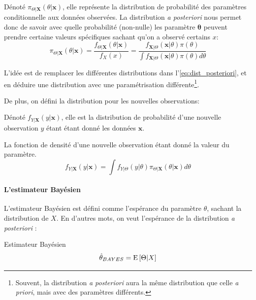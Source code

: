 \documentclass[10pt, french]{article}
\begin{document}
\begin{multicols*}{3}
\begin{definitionNOHFILL}
Dénoté $\pi_{\Theta | \bm{X}}(\theta | \bm{x})$, elle représente la distribution de probabilité des paramètres conditionnelle aux données observées. 
La distribution \emph{a posteriori} nous permet donc de savoir avec quelle probabilité (non-nulle) les paramètre $\bm\theta$ peuvent prendre certaine valeurs spécifiques sachant qu'on a observé certains $x$: 
\begin{equation}
\label{eq:dist_posteriori}
	\pi_{\Theta | \bm{X}}(\theta | \bm{x})
	= 	\frac{f_{\Theta | \bm{X}}(\theta | \bm{x})}{f_{X}(x)} 
	= 	\frac{f_{\bm{X}|\Theta}(\bm{x} | \theta) \pi(\theta)}{\int f_{\bm{X}|\Theta}(\bm{x} | \theta) \pi(\theta) d\theta} 
\end{equation}

L'idée est de remplacer les différentes distributions dans l'\autoref{eq:dist_posteriori}, et en déduire une distribution avec une paramétrisation différente\footnote{Souvent, la distribution \emph{a posteriori} aura la même distribution que celle \emph{a priori}, mais avec des paramètres différents.}.
\end{definitionNOHFILL}

De plus, on défini la distribution pour les nouvelles observations:
\begin{definitionNOHFILL}
Dénoté $f_{Y | \bm{X}}(y | \bm{x})$, elle est la distribution de probabilité d'une nouvelle observation $y$ étant étant donné les données $\bm{x}$.

La fonction de densité d'une nouvelle observation étant donné la valeur du paramètre.
\begin{equation*}
	f_{Y | \bm{X}}(y | \bm{x})
	=	\int f_{Y|\Theta}(y | \theta) \pi_{\Theta | \bm{X}}(\theta | \bm{x}) d\theta
\end{equation*}

\end{definitionNOHFILL}


\paragraph{L'estimateur Bayésien} L'estimateur Bayésien est défini comme l'espérance du paramètre $\theta$, sachant la distribution de $X$. 
En d'autres mots, on veut l'espérance de la distribution \emph{a posteriori} : 

\begin{algo}{Estimateur Bayésien}
\begin{equation}
\label{eq:estimateur_bayes}
	\hat{\theta}_{BAYES} 
	=	\mathrm{E} \left[ \Theta | X \right]
\end{equation}
\end{algo}


\end{multicols*}
\end{document}
